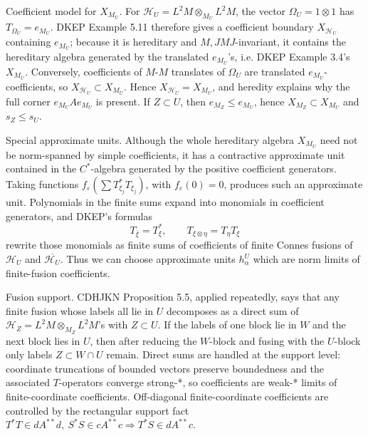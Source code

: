 \documentclass{article}
\begin{document}
Coefficient model for \(X_{M_U}\).  For
\(\mathcal H_U=L^2M\otimes_{M_U}L^2M\), the vector
\(\Omega_U=1\otimes 1\) has \(T_{\Omega_U}=e_{M_U}\).  DKEP Example 5.11
therefore gives a coefficient boundary \(X_{\mathcal H_U}\) containing
\(e_{M_U}\); because it is hereditary and \(M,JMJ\)-invariant, it contains the
hereditary algebra generated by the translated \(e_{M_U}\)'s, i.e. DKEP
Example 3.4's \(X_{M_U}\).  Conversely, coefficients of \(M\)-\(M\) translates
of \(\Omega_U\) are translated \(e_{M_U}\)-coefficients, so
\(X_{\mathcal H_U}\subset X_{M_U}\).  Hence \(X_{\mathcal H_U}=X_{M_U}\), and
heredity explains why the full corner \(e_{M_U}A e_{M_U}\) is present.  If
\(Z\subset U\), then \(e_{M_Z}\le e_{M_U}\), hence \(X_{M_Z}\subset X_{M_U}\)
and \(s_Z\le s_U\).

Special approximate units.  Although the whole hereditary algebra \(X_{M_U}\)
need not be norm-spanned by simple coefficients, it has a contractive
approximate unit contained in the \(C^*\)-algebra generated by the positive
coefficient generators.  Taking functions \(f_\varepsilon(\sum T_{\xi_j}^*
T_{\xi_j})\), with \(f_\varepsilon(0)=0\), produces such an approximate unit.
Polynomials in the finite sums expand into monomials in coefficient generators,
and DKEP's formulas
\[
        T_{\bar\xi}=T_\xi^*,\qquad
        T_{\xi\otimes\eta}=T_\eta T_\xi
\]
rewrite those monomials as finite sums of coefficients of finite Connes fusions
of \(\mathcal H_U\) and \(\overline{\mathcal H_U}\).  Thus we can choose
approximate units \(h_\alpha^U\) which are norm limits of finite-fusion
coefficients.

Fusion support.  CDHJKN Proposition 5.5, applied repeatedly, says that any
finite fusion whose labels all lie in \(U\) decomposes as a direct sum of
\(\mathcal H_Z=L^2M\otimes_{M_Z}L^2M\)'s with \(Z\subset U\).  If the labels of
one block lie in \(W\) and the next block lies in \(U\), then after reducing the
\(W\)-block and fusing with the \(U\)-block only labels \(Z\subset W\cap U\)
remain.  Direct sums are handled at the support level: coordinate truncations of
bounded vectors preserve boundedness and the associated \(T\)-operators
converge strong-*, so coefficients are weak-* limits of finite-coordinate
coefficients.  Off-diagonal finite-coordinate coefficients are controlled by
the rectangular support fact \(T^*T\in dA^{**}d,\ S^*S\in cA^{**}c
\Rightarrow T^*S\in dA^{**}c\).
\end{document}
